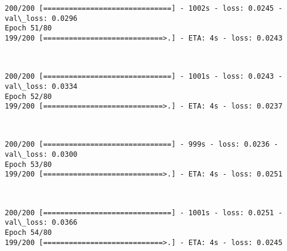 \documentclass[11pt]{article}
\begin{document}
    \begin{Verbatim}[commandchars=\\\{\}]
200/200 [==============================] - 1002s - loss: 0.0245 - val\_loss: 0.0296
Epoch 51/80
199/200 [============================>.] - ETA: 4s - loss: 0.0243
    \end{Verbatim}

    \begin{center}
    \end{center}
    { \hspace*{\fill} \\}
    
    \begin{Verbatim}[commandchars=\\\{\}]
200/200 [==============================] - 1001s - loss: 0.0243 - val\_loss: 0.0334
Epoch 52/80
199/200 [============================>.] - ETA: 4s - loss: 0.0237
    \end{Verbatim}

    \begin{center}
    \end{center}
    { \hspace*{\fill} \\}
    
    \begin{Verbatim}[commandchars=\\\{\}]
200/200 [==============================] - 999s - loss: 0.0236 - val\_loss: 0.0300
Epoch 53/80
199/200 [============================>.] - ETA: 4s - loss: 0.0251
    \end{Verbatim}

    \begin{center}
    \end{center}
    { \hspace*{\fill} \\}
    
    \begin{Verbatim}[commandchars=\\\{\}]
200/200 [==============================] - 1001s - loss: 0.0251 - val\_loss: 0.0366
Epoch 54/80
199/200 [============================>.] - ETA: 4s - loss: 0.0245
    \end{Verbatim}

    \begin{center}
    \end{center}
    { \hspace*{\fill} \\}
    
\end{document}

